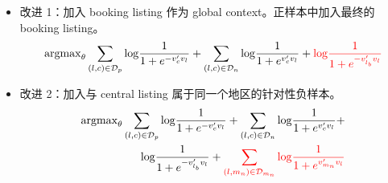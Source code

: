 \begin{itemize}
  \item 改进 1：加入 booking listing 作为 global context。正样本中加入最终的
    booking listing。
    \begin{equation}
      \mathrm{argmax}_{\theta} \sum_{(l, c) \in \mathcal{D}_{p}} \mathrm{log} \frac{1}{1 + e^{-v'_c v_l}} + \sum_{(l, c) \in \mathcal{D}_{n}} \mathrm{log} \frac{1}{1 + e^{v'_c v_l}} + {\color{red}{\mathrm{log} \frac{1}{1 + e^{-v'_{l_b}v_l}}}}
    \end{equation}
  \item 改进 2：加入与 central listing 属于同一个地区的针对性负样本。
    \begin{equation}
    \begin{split}
      \mathrm{argmax}_{\theta} \sum_{(l, c) \in \mathcal{D}_{p}} \mathrm{log} \frac{1}{1 + e^{-v'_c v_l}} + \sum_{(l, c) \in \mathcal{D}_{n}} \mathrm{log} \frac{1}{1 + e^{v'_c v_l}} + \\ {\mathrm{log} \frac{1}{1 + e^{-v'_{l_b}v_l}}} + {\color{red}{\sum_{(l, m_n) \in \mathcal{D}_{m_n}} \mathrm{log} \frac{1}{1 + e^{v'_{m_n} v_l}}}}
    \end{split}
  \end{equation}
\end{itemize} 


